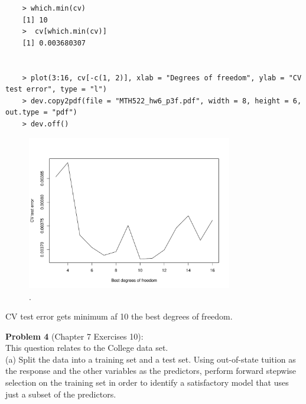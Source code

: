 \documentclass{article}
\begin{document}
\newpage


\begin{program}
	\begin{verbatim}
	> which.min(cv)
	[1] 10
	>  cv[which.min(cv)]
	[1] 0.003680307
	
	
	> plot(3:16, cv[-c(1, 2)], xlab = "Degrees of freedom", ylab = "CV test error", type = "l")
	> dev.copy2pdf(file = "MTH522_hw6_p3f.pdf", width = 8, height = 6, out.type = "pdf")
	> dev.off()
	\end{verbatim}
\end{program}


\begin{figure}[htb]
	\begin{center}
		\includegraphics[width=0.8\textwidth]{MTH522_hw6_p3f.pdf}
	\end{center}
	\caption{.}
	\label{fig:MTH522_hw6_p3f}
\end{figure}

CV test error gets minimum af 10 the best degrees of freedom.

\newpage



{\bf Problem 4} (Chapter 7 Exercises 10):\\
This question relates to the College data set.\\

(a) Split the data into a training set and a test set. Using out-of-state tuition as the response and the other variables as the predictors, perform forward stepwise selection on the training set in order to identify a satisfactory model that uses just a subset of the predictors.\\
\end{document}
